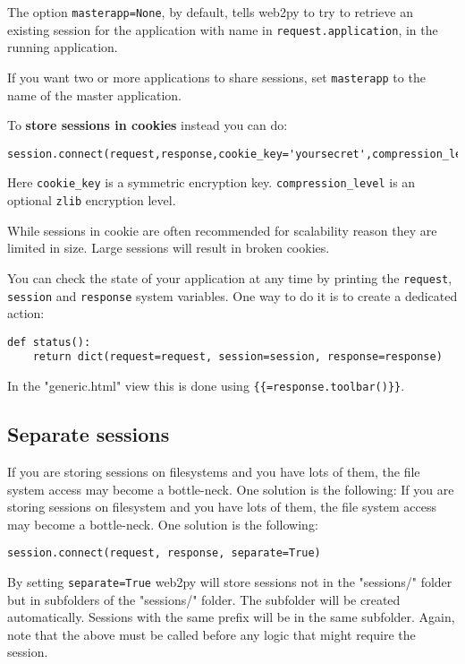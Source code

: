 \documentclass[justified,sixbynine,notoc]{tufte-book}
\def\ft{\small\tt}
\begin{document}
\begin{fullwidth}
The option {\ft masterapp=None}, by default, tells web2py to try to retrieve an existing session for the application with name in {\ft request.application}, in the running application.

If you want two or more applications to share sessions, set {\ft masterapp} to the name of the master application.

To {\bf store sessions in cookies} instead you can do:

\begin{lstlisting}
session.connect(request,response,cookie_key='yoursecret',compression_level=None)
\end{lstlisting}

Here {\ft cookie\_key} is a symmetric encryption key.
{\ft compression\_level} is an optional {\ft zlib} encryption level.

While sessions in cookie are often recommended for scalability reason they are limited in size. Large sessions will result in broken cookies.

You can check the state of your application at any time by printing the {\ft request}, {\ft session} and {\ft response} system variables. One way to do it is to create a dedicated action:
\begin{lstlisting}
def status():
    return dict(request=request, session=session, response=response)
\end{lstlisting}

In the "generic.html" view this is done using {\ft \{\{=response.toolbar()\}\}}.

\goodbreak\subsection{Separate sessions}

If you are storing sessions on filesystems and you have lots of them, the file system access may become a bottle-neck. One solution is the following:
If you are storing sessions on filesystem and you have lots of them, the file system access may become a bottle-neck. One solution is the following:
\begin{lstlisting}
session.connect(request, response, separate=True)
\end{lstlisting}

By setting {\ft separate=True} web2py will store sessions not in the "sessions/" folder but in subfolders of the "sessions/" folder. The subfolder will be created automatically. Sessions with the same prefix will be in the same subfolder. Again, note that the above must be called before any logic that might require the session.


\end{fullwidth}
\end{document}

